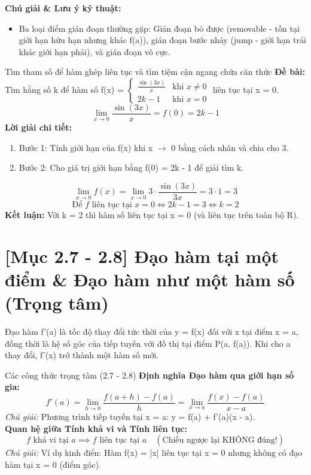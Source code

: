 \documentclass[11pt,a4paper,oneside]{book}
\begin{document}
\noindent\textbf{Chú giải \& Lưu ý kỹ thuật:}
\begin{itemize}[leftmargin=1.5em, itemsep=2pt]
  \item Ba loại điểm gián đoạn thường gặp: Gián đoạn bỏ được (removable - tồn tại giới hạn hữu hạn nhưng khác f(a)), gián đoạn bước nhảy (jump - giới hạn trái khác giới hạn phải), và gián đoạn vô cực.
\end{itemize}

\begin{vidu}{Tìm tham số để hàm ghép liên tục và tìm tiệm cận ngang chứa căn thức}
\textbf{Đề bài:} Tìm hằng số k để hàm số f(x) = $\begin{cases} \frac{\sin(3x)}{x} & \text{khi } x \neq 0 \\ 2k - 1 & \text{khi } x = 0 \end{cases}$ liên tục tại x = 0.
\[ \lim_{x \to 0} \frac{\sin(3x)}{x} = f(0) = 2k - 1 \]
\textbf{Lời giải chi tiết:}
\begin{enumerate}[leftmargin=1.5em, itemsep=2pt]
  \item Bước 1: Tính giới hạn của f(x) khi x $\to$  0 bằng cách nhân và chia cho 3.
  \item Bước 2: Cho giá trị giới hạn bằng f(0) = 2k - 1 để giải tìm k.
\end{enumerate}
\[ \lim_{x \to 0} f(x) = \lim_{x \to 0} 3 \cdot \frac{\sin(3x)}{3x} = 3 \cdot 1 = 3 \]
\[ \text{Để } f \text{ liên tục tại } x = 0 \iff 2k - 1 = 3 \iff k = 2 \]
\noindent\textbf{Kết luận:} Với k = 2 thì hàm số liên tục tại x = 0 (và liên tục trên toàn bộ R).
\end{vidu}

\section{[Mục 2.7 - 2.8] Đạo hàm tại một điểm \& Đạo hàm như một hàm số (Trọng tâm)}
Đạo hàm f'(a) là tốc độ thay đổi tức thời của y = f(x) đối với x tại điểm x = a, đồng thời là hệ số góc của tiếp tuyến với đồ thị tại điểm P(a, f(a)). Khi cho a thay đổi, f'(x) trở thành một hàm số mới.

\begin{congthuc}{Các công thức trọng tâm (2.7 - 2.8)}
\noindent\textbf{Định nghĩa Đạo hàm qua giới hạn số gia:}
\[ f'(a) = \lim_{h \to 0} \frac{f(a + h) - f(a)}{h} = \lim_{x \to a} \frac{f(x) - f(a)}{x - a} \]
\noindent\textit{Chú giải:} Phương trình tiếp tuyến tại x = a: y = f(a) + f'(a)(x - a).\\[4pt]
\noindent\textbf{Quan hệ giữa Tính khả vi và Tính liên tục:}
\[ f \text{ khả vi tại } a \implies f \text{ liên tục tại } a \quad (\text{Chiều ngược lại KHÔNG đúng!}) \]
\noindent\textit{Chú giải:} Ví dụ kinh điển: Hàm f(x) = |x| liên tục tại x = 0 nhưng không có đạo hàm tại x = 0 (điểm góc).\\[4pt]
\end{congthuc}
\end{document}
